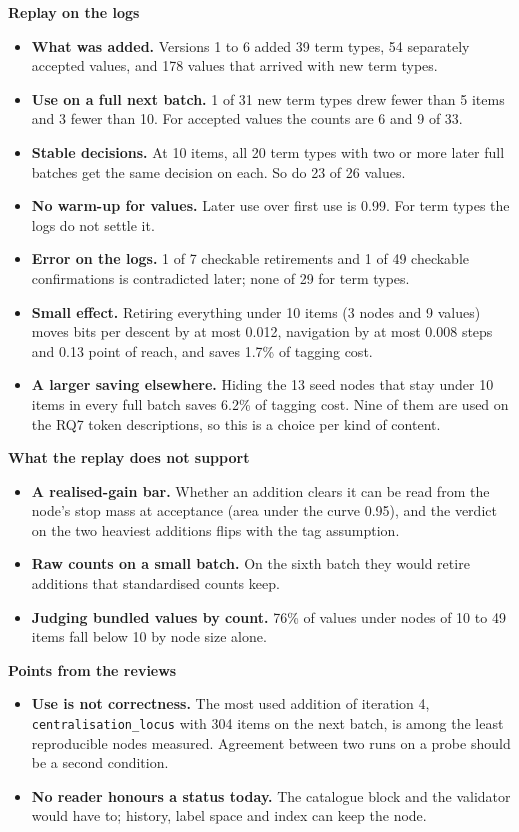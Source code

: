 \documentclass[10pt,a4paper]{article}
\newcommand{\code}[1]{\texttt{#1}}
\newcommand{\lab}[1]{\par\vspace{0.35em}\textbf{#1}\par\nobreak}
\begin{document}
\lab{Replay on the logs}
\begin{itemize}
\item \textbf{What was added.} Versions 1 to 6 added 39 term types, 54 separately accepted values, and 178 values that arrived with new term types.
\item \textbf{Use on a full next batch.} 1 of 31 new term types drew fewer than 5 items and 3 fewer than 10. For accepted values the counts are 6 and 9 of 33.
\item \textbf{Stable decisions.} At 10 items, all 20 term types with two or more later full batches get the same decision on each. So do 23 of 26 values.
\item \textbf{No warm-up for values.} Later use over first use is 0.99. For term types the logs do not settle it.
\item \textbf{Error on the logs.} 1 of 7 checkable retirements and 1 of 49 checkable confirmations is contradicted later; none of 29 for term types.
\item \textbf{Small effect.} Retiring everything under 10 items (3 nodes and 9 values) moves bits per descent by at most 0.012, navigation by at most 0.008 steps and 0.13 point of reach, and saves 1.7\% of tagging cost.
\item \textbf{A larger saving elsewhere.} Hiding the 13 seed nodes that stay under 10 items in every full batch saves 6.2\% of tagging cost. Nine of them are used on the RQ7 token descriptions, so this is a choice per kind of content.
\end{itemize}

\lab{What the replay does not support}
\begin{itemize}
\item \textbf{A realised-gain bar.} Whether an addition clears it can be read from the node's stop mass at acceptance (area under the curve 0.95), and the verdict on the two heaviest additions flips with the tag assumption.
\item \textbf{Raw counts on a small batch.} On the sixth batch they would retire additions that standardised counts keep.
\item \textbf{Judging bundled values by count.} 76\% of values under nodes of 10 to 49 items fall below 10 by node size alone.
\end{itemize}

\lab{Points from the reviews}
\begin{itemize}
\item \textbf{Use is not correctness.} The most used addition of iteration 4, \code{centralisation\_locus} with 304 items on the next batch, is among the least reproducible nodes measured. Agreement between two runs on a probe should be a second condition.
\item \textbf{No reader honours a status today.} The catalogue block and the validator would have to; history, label space and index can keep the node.
\end{itemize}
\end{document}
